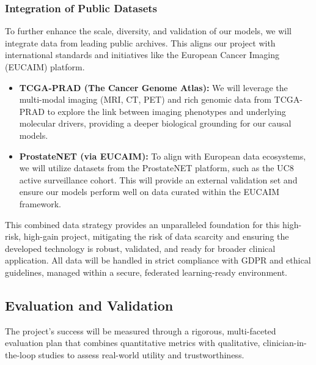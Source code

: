 \documentclass[11pt, a4paper]{article}
\begin{document}
\subsubsection{Integration of Public Datasets}
To further enhance the scale, diversity, and validation of our models, we will integrate data from leading public archives. This aligns our project with international standards and initiatives like the European Cancer Imaging (EUCAIM) platform.
\begin{itemize}
    \item \textbf{TCGA-PRAD (The Cancer Genome Atlas):} We will leverage the multi-modal imaging (MRI, CT, PET) and rich genomic data from TCGA-PRAD to explore the link between imaging phenotypes and underlying molecular drivers, providing a deeper biological grounding for our causal models.
    \item \textbf{ProstateNET (via EUCAIM):} To align with European data ecosystems, we will utilize datasets from the ProstateNET platform, such as the UC8 active surveillance cohort. This will provide an external validation set and ensure our models perform well on data curated within the EUCAIM framework.
\end{itemize}
This combined data strategy provides an unparalleled foundation for this high-risk, high-gain project, mitigating the risk of data scarcity and ensuring the developed technology is robust, validated, and ready for broader clinical application. All data will be handled in strict compliance with GDPR and ethical guidelines, managed within a secure, federated learning-ready environment.

\subsection{Evaluation and Validation}
The project's success will be measured through a rigorous, multi-faceted evaluation plan that combines quantitative metrics with qualitative, clinician-in-the-loop studies to assess real-world utility and trustworthiness.
\end{document}
